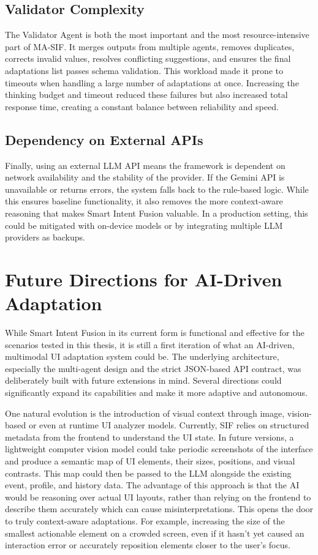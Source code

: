 \documentclass[openany]{book}
\begin{document}
\subsection{Validator Complexity}
The Validator Agent is both the most important and the most resource-intensive part of MA-SIF. It merges outputs from multiple agents, removes duplicates, corrects invalid values, resolves conflicting suggestions, and ensures the final adaptations list passes schema validation. This workload made it prone to timeouts when handling a large number of adaptations at once. Increasing the thinking budget and timeout reduced these failures but also increased total response time, creating a constant balance between reliability and speed.

\subsection{Dependency on External APIs}
Finally, using an external LLM API means the framework is dependent on network availability and the stability of the provider. If the Gemini API is unavailable or returns errors, the system falls back to the rule-based logic. While this ensures baseline functionality, it also removes the more context-aware reasoning that makes Smart Intent Fusion valuable. In a production setting, this could be mitigated with on-device models or by integrating multiple LLM providers as backups.

\section{Future Directions for AI-Driven Adaptation}
While Smart Intent Fusion in its current form is functional and effective for the scenarios tested in this thesis, it is still a first iteration of what an AI-driven, multimodal UI adaptation system could be. The underlying architecture, especially the multi-agent design and the strict JSON-based API contract, was deliberately built with future extensions in mind. Several directions could significantly expand its capabilities and make it more adaptive and autonomous.

One natural evolution is the introduction of visual context through image, vision-based or even at runtime UI analyzer models. Currently, SIF relies on structured metadata from the frontend to understand the UI state. In future versions, a lightweight computer vision model could take periodic screenshots of the interface and produce a semantic map of UI elements, their sizes, positions, and visual contrasts. This map could then be passed to the LLM alongside the existing event, profile, and history data. The advantage of this approach is that the AI would be reasoning over actual UI layouts, rather than relying on the frontend to describe them accurately which can cause misinterpretations. This opens the door to truly context-aware adaptations. For example, increasing the size of the smallest actionable element on a crowded screen, even if it hasn’t yet caused an interaction error or accurately reposition elements closer to the user's focus.
\end{document}
